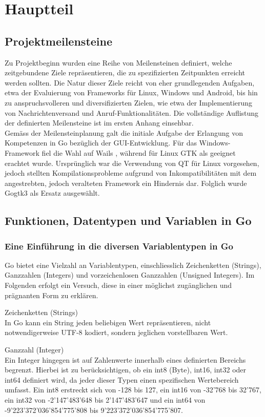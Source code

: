 \section{Hauptteil}
\subsection{Projektmeilensteine}
Zu Projektbeginn wurden eine Reihe von Meilensteinen definiert, welche zeitgebundene Ziele repräsentieren, die zu spezifizierten Zeitpunkten erreicht werden sollten. Die Natur dieser Ziele reicht von eher grundlegenden Aufgaben, etwa der Evaluierung von Frameworks für Linux, Windows und Android, bis hin zu anspruchsvolleren und diversifizierten Zielen, wie etwa der Implementierung von Nachrichtenversand und Anruf-Funktionalitäten. Die vollständige Auflistung der definierten Meilensteine ist im ersten Anhang einsehbar.\\
Gemäss der Meilensteinplanung galt die initiale Aufgabe der Erlangung von Kompetenzen in Go bezüglich der GUI-Entwicklung. Für das Windows-Framework fiel die Wahl auf Wails \cite{wails}, während für Linux GTK als geeignet erachtet wurde. Ursprünglich war die Verwendung von QT \cite{qt} für Linux vorgesehen, jedoch stellten Kompilationsprobleme aufgrund von Inkompatibilitäten mit dem angestrebten, jedoch veralteten Framework ein Hindernis dar. Folglich wurde Gogtk3 \cite{gogtk3} als Ersatz ausgewählt.
\subsection{Funktionen, Datentypen und Variablen in Go}
\subsubsection{Eine Einführung in die diversen Variablentypen in Go}
Go bietet eine Vielzahl an Variablentypen, einschliesslich Zeichenketten (Strings), Ganzzahlen (Integers) und vorzeichenlosen Ganzzahlen (Unsigned Integers). Im Folgenden erfolgt ein Versuch, diese in einer möglichst zugänglichen und prägnanten Form zu erklären.

Zeichenketten (Strings)\\
In Go kann ein String jeden beliebigen Wert repräsentieren, nicht notwendigerweise UTF-8 kodiert, sondern jeglichen vorstellbaren Wert.

Ganzzahl (Integer)\\
Ein Integer hingegen ist auf Zahlenwerte innerhalb eines definierten Bereichs begrenzt. Hierbei ist zu berücksichtigen, ob ein int8 (Byte), int16, int32 oder int64 definiert wird, da jeder dieser Typen einen spezifischen Wertebereich umfasst. Ein int8 erstreckt sich von -128 bis 127, ein int16 von -32'768 bis 32'767, ein int32 von -2'147'483'648 bis 2'147'483'647 und ein int64 von -9'223'372'036'854'775'808 bis 9'223'372'036'854'775'807.

